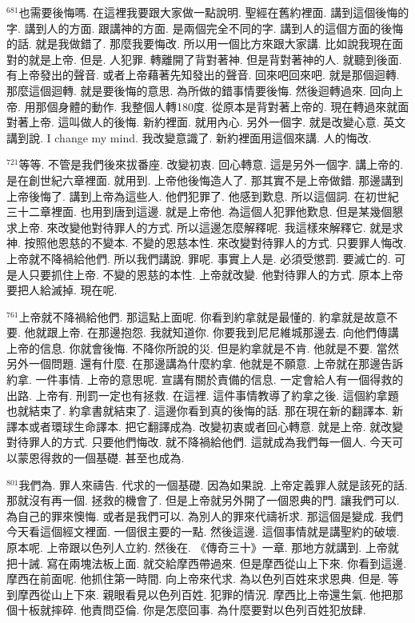 \documentclass{book}
\begin{document}
$^{681}$也需要後悔嗎.
在這裡我要跟大家做一點說明.
聖經在舊約裡面.
講到這個後悔的字.
講到人的方面.
跟講神的方面.
是兩個完全不同的字.
講到人的這個方面的後悔的話.
就是我做錯了.
那麼我要悔改.
所以用一個比方來跟大家講.
比如說我現在面對的就是上帝.
但是.
人犯罪.
轉離開了背對著神.
但是背對著神的人.
就聽到後面.
有上帝發出的聲音.
或者上帝藉著先知發出的聲音.
回來吧回來吧.
就是那個迴轉.
那麼這個迴轉.
就是要後悔的意思.
為所做的錯事情要後悔.
然後迴轉過來.
回向上帝.
用那個身體的動作.
我整個人轉180度.
從原本是背對著上帝的.
現在轉過來就面對著上帝.
這叫做人的後悔.
新約裡面.
就用內心.
另外一個字.
就是改變心意.
英文講到說.
I change my mind.
我改變意識了.
新約裡面用這個來講.
人的悔改.

$^{721}$等等.
不管是我們後來拔番座.
改變初衷.
回心轉意.
這是另外一個字.
講上帝的.
是在創世紀六章裡面.
就用到.
上帝他後悔造人了.
那其實不是上帝做錯.
那邊講到上帝後悔了.
講到上帝為這些人.
他們犯罪了.
他感到歎息.
所以這個詞.
在初世紀三十二章裡面.
也用到唐到這邊.
就是上帝他.
為這個人犯罪他歎息.
但是某幾個懇求上帝.
來改變他對待罪人的方式.
所以這邊怎麼解釋呢.
我這樣來解釋它.
就是求神.
按照他恩慈的不變本.
不變的恩慈本性.
來改變對待罪人的方式.
只要罪人悔改.
上帝就不降禍給他們.
所以我們講說.
罪呢.
事實上人是.
必須受懲罰.
要滅亡的.
可是人只要抓住上帝.
不變的恩慈的本性.
上帝就改變.
他對待罪人的方式.
原本上帝要把人給滅掉.
現在呢.

$^{761}$上帝就不降禍給他們.
那這點上面呢.
你看到約拿就是最懂的.
約拿就是故意不要.
他就跟上帝.
在那邊抱怨.
我就知道你.
你要我到尼尼維城那邊去.
向他們傳講上帝的信息.
你就會後悔.
不降你所說的災.
但是約拿就是不肯.
他就是不要.
當然另外一個問題.
還有什麼.
在那邊講為什麼約拿.
他就是不願意.
上帝就在那邊告訴約拿.
一件事情.
上帝的意思呢.
宣講有關於責備的信息.
一定會給人有一個得救的出路.
上帝有.
刑罰一定也有拯救.
在這裡.
這件事情教導了約拿之後.
這個約拿題也就結束了.
約拿書就結束了.
這邊你看到真的後悔的話.
那在現在新的翻譯本.
新譯本或者環球生命譯本.
把它翻譯成為.
改變初衷或者回心轉意.
就是上帝.
就改變對待罪人的方式.
只要他們悔改.
就不降禍給他們.
這就成為我們每一個人.
今天可以蒙恩得救的一個基礎.
甚至也成為.

$^{801}$我們為.
罪人來禱告.
代求的一個基礎.
因為如果說.
上帝定義罪人就是該死的話.
那就沒有再一個.
拯救的機會了.
但是上帝就另外開了一個恩典的門.
讓我們可以.
為自己的罪來懊悔.
或者是我們可以.
為別人的罪來代禱祈求.
那這個是變成.
我們今天看這個經文裡面.
一個很主要的一點.
然後這邊.
這個事情就是講聖約的破壞.
原本呢.
上帝跟以色列人立約.
然後在.
《傳奇三十》一章.
那地方就講到.
上帝就把十誡.
寫在兩塊法板上面.
就交給摩西帶過來.
但是摩西從山上下來.
你看到這邊.
摩西在前面呢.
他抓住第一時間.
向上帝來代求.
為以色列百姓來求恩典.
但是.
等到摩西從山上下來.
親眼看見以色列百姓.
犯罪的情況.
摩西比上帝還生氣.
他把那個十板就摔碎.
他責問亞倫.
你是怎麼回事.
為什麼要對以色列百姓犯放肆.
\end{document}
